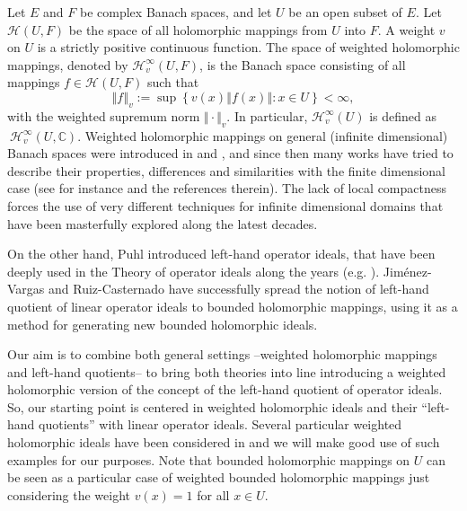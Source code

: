 \documentclass[12pt]{amsart}
\theoremstyle{plain}
\numberwithin{equation}{section}
\begin{document}
Let $E$ and $F$ be complex Banach spaces, and let $U$ be an open subset of $%
E $. Let $\mathcal{H}(U,F)$ be the space of all holomorphic mappings from $U$
into $F$. A weight $v$ on $U$ is a strictly positive continuous function.
The space of weighted holomorphic mappings, denoted by $\mathcal{H}%
_{v}^{\infty }(U,F)$, is the Banach space consisting of all mappings $f\in 
\mathcal{H}(U,F)$ such that%
\begin{equation*}
\left\Vert f\right\Vert _{v}:=\sup \left\{ v(x)\left\Vert f(x)\right\Vert
\colon x\in U\right\} <\infty ,
\end{equation*}%
with the weighted supremum norm $\Vert \cdot \Vert _{v}$. In particular, $%
\mathcal{H}_{v}^{\infty }(U)$ is defined as$\ \mathcal{H}_{v}^{\infty }(U,%
\mathbb{C})$. Weighted holomorphic mappings on general (infinite dimensional) Banach spaces were introduced in \cite{GaMaRu} and \cite{Ru}, and since then many works have tried to describe their properties, differences and similarities with the finite dimensional case (see for instance \cite{BaDe1,BlaGaMi,  BaDe, BaDe3, JiRaVi,Jo} and the references therein). The lack of local compactness  forces the use of very different techniques for infinite dimensional domains that have been masterfully explored along the latest decades. 

On the other hand, Puhl \cite{Puhl1977} introduced left-hand operator ideals, that have been deeply used in the Theory of operator ideals along the years (e.g. \cite{CaDe,CaNa,JoLiO,Ki}).  Jim\'enez-Vargas and Ruiz-Casternado \cite{JimAysRuiz24} have successfully spread the notion of left-hand quotient of linear operator ideals to bounded holomorphic mappings, using it as a method for generating new bounded holomorphic ideals. 

Our aim is to combine both general settings --weighted holomorphic mappings and left-hand quotients-- to bring both theories into line introducing  a weighted holomorphic version of the concept of the
left-hand quotient of operator ideals. So, our starting point is centered in  weighted holomorphic ideals and their ``left-hand quotients'' with linear operator ideals. Several particular weighted holomorphic ideals have been considered in \cite{CaJiKe} and we will make good use of such examples for our purposes. Note that bounded  holomorphic mappings on $U$ can be seen as a particular case of weighted bounded holomorphic mappings just considering the weight $v(x)=1$ for all $x\in U$. 
\end{document}
